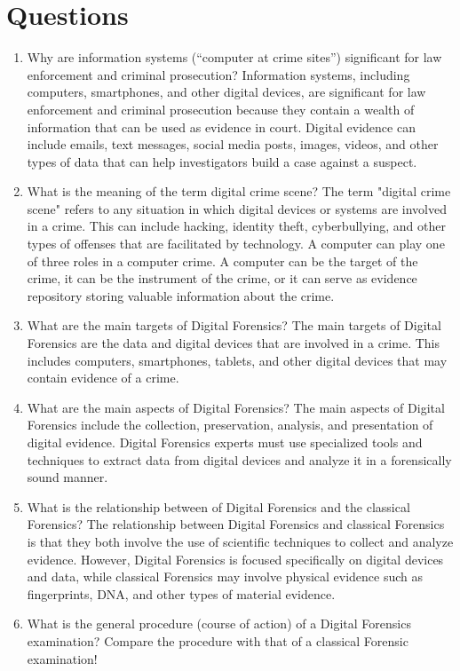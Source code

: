 \documentclass{scrreprt}
\begin{document}
\section{Questions}
\begin{enumerate}
\item  Why are information systems (“computer at crime sites”) significant for law enforcement and criminal prosecution? 
Information systems, including computers, smartphones, and other digital devices, are significant for law enforcement and criminal prosecution because they contain a wealth of information that can be used as evidence in court. Digital evidence can include emails, text messages, social media posts, images, videos, and other types of data that can help investigators build a case against a suspect.
\item What is the meaning of the term digital crime scene? 
The term "digital crime scene" refers to any situation in which digital devices or systems are involved in a crime. This can include hacking, identity theft, cyberbullying, and other types of offenses that are facilitated by technology. A computer can play one of three roles in a computer crime. A computer can be the target of the crime, it can be the instrument of the crime, or it can serve as evidence repository storing valuable information about the crime.
\item What are the main targets of Digital Forensics? 
The main targets of Digital Forensics are the data and digital devices that are involved in a crime. This includes computers, smartphones, tablets, and other digital devices that may contain evidence of a crime.
\item What are the main aspects of Digital Forensics? 
The main aspects of Digital Forensics include the collection, preservation, analysis, and presentation of digital evidence. Digital Forensics experts must use specialized tools and techniques to extract data from digital devices and analyze it in a forensically sound manner.
\item What is the relationship between of Digital Forensics and the classical Forensics? 
The relationship between Digital Forensics and classical Forensics is that they both involve the use of scientific techniques to collect and analyze evidence. However, Digital Forensics is focused specifically on digital devices and data, while classical Forensics may involve physical evidence such as fingerprints, DNA, and other types of material evidence.
\item What is the general procedure (course of action) of a Digital Forensics examination? Compare the procedure with that of a classical Forensic examination! 

\end{enumerate}
\end{document}
